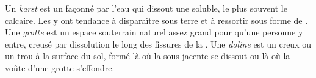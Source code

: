 \begin{definition}\label{def:g9:landforms:karst}
Un \emph{karst} est un  façonné par l'eau qui dissout
une  soluble, le plus souvent le calcaire. Les  y ont
tendance à disparaître sous terre et à ressortir sous forme de .
Une \emph{grotte} est un espace souterrain naturel assez
grand pour qu'une personne y entre, creusé par dissolution le long des
fissures de la . Une \emph{doline} est un creux ou un
trou à la surface du sol, formé là où la  sous-jacente se dissout ou
là où la voûte d'une grotte s'effondre.
\end{definition}

